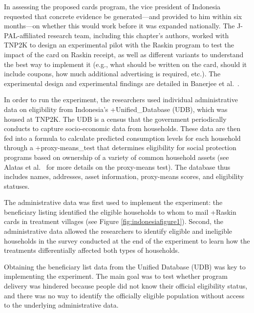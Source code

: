 \documentclass[
]{WileySix}
\begin{document}
In assessing the proposed cards program, the vice president of Indonesia requested that concrete evidence be generated---and provided to him within six months---on whether this would work before it was expanded nationally. The J-PAL-affiliated research team, including this chapter's authors, worked with TNP2K to design an experimental pilot with the Raskin program to test the impact of the card on Raskin receipt, as well as different variants to understand the best way to implement it (e.g., what should be written on the card, should it include coupons, how much additional advertising is required, etc.). The experimental design and experimental findings are detailed in Banerjee et al.~\citeyearpar{banerjee2018}.

In order to run the experiment, the researchers used individual administrative data on eligibility from Indonesia's +Unified\_Database\textbar{} (UDB), which was housed at TNP2K. The UDB is a census that the government periodically conducts to capture socio-economic data from households. These data are then fed into a formula to calculate predicted consumption levels for each household through a +proxy-means\_test\textbar{} that determines eligibility for social protection programs based on ownership of a variety of common household assets (see Alatas et al.~\citeyearpar{alatas2012} for more details on the proxy-means test). The database thus includes names, addresses, asset information, proxy-means scores, and eligibility statuses.

The administrative data was first used to implement the experiment: the beneficiary listing identified the eligible households to whom to mail +Raskin\textbar{} cards in treatment villages (see Figure \ref{fig:indonesiafigure1}). Second, the administrative data allowed the researchers to identify eligible and ineligible households in the survey conducted at the end of the experiment to learn how the treatments differentially affected both types of households.

Obtaining the beneficiary list data from the Unified Database (UDB) was key to implementing the experiment. The main goal was to test whether program delivery was hindered because people did not know their official eligibility status, and there was no way to identify the officially eligible population without access to the underlying administrative data.
\end{document}
